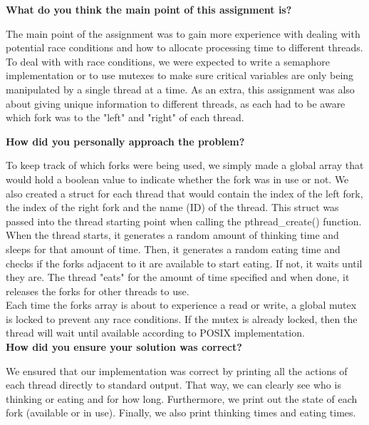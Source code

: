 \documentclass[10pt,letterpaper,draftclsnofoot,onecolumn]{IEEEtran}
\begin{document}
\bigskip

\noindent\textbf{What do you think the main point of this assignment is?}
\medskip

\noindent The main point of the assignment was to gain more experience with dealing with potential race conditions and how to allocate processing time to different threads. To deal with with race conditions, we were expected to write a semaphore implementation or to use mutexes to make sure critical variables are only being manipulated by a single thread at a time. As an extra, this assignment was also about giving unique information to different threads, as each had to be aware which fork was to the "left" and "right" of each thread.
\medskip

\bigskip

\noindent\textbf{How did you personally approach the problem?}
\medskip

\noindent To keep track of which forks were being used, we simply made a global array that would hold a boolean value to indicate whether the fork was in use or not. We also created a struct for each thread that would contain the index of the left fork, the index of the right fork and the name (ID) of the thread. This struct was passed into the thread starting point when calling the pthread_create() function.\\
\medskip
\noindent When the thread starts, it generates a random amount of thinking time and sleeps for that amount of time. Then, it generates a random eating time and checks if the forks adjacent to it are available to start eating. If not, it waits until they are. The thread "eats" for the amount of time specified and when done, it releases the forks for other threads to use.\\
\medskip
\noindent Each time the forks array is about to experience a read or write, a global mutex is locked to prevent any race conditions. If the mutex is already locked, then the thread will wait until available according to POSIX implementation.\\

\noindent\textbf{How did you ensure your solution was correct?}
\medskip

\noindent We ensured that our implementation was correct by printing all the actions of each thread directly to standard output. That way, we can clearly see who is thinking or eating and for how long. Furthermore, we print out the state of each fork (available or in use). Finally, we also print thinking times and eating times.\\
\medskip
\end{document}
